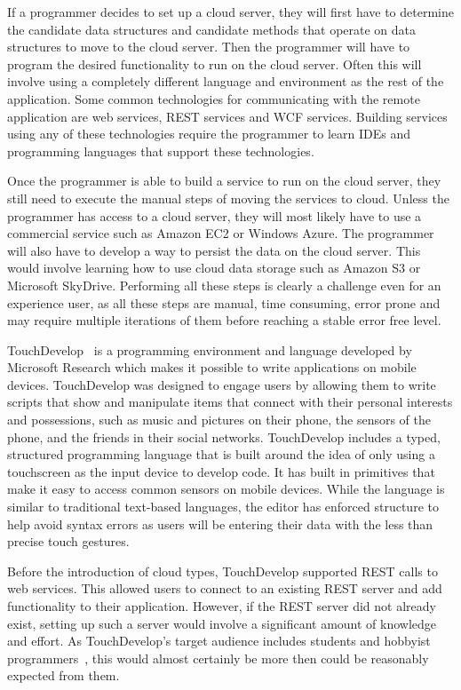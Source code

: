\documentclass{sigplanconf}
\begin{document}
If a programmer decides to set up a cloud server, they will first have to determine the candidate data structures and candidate methods that operate on data structures to move to the cloud server. Then the programmer will have to program the desired functionality to run on the cloud server.  Often this will involve using a completely different language and environment as the rest of the application.  Some common technologies for communicating with the remote application are web services, REST services and WCF services. Building services using any of these technologies require the programmer to learn IDEs and programming languages that support these technologies.

 Once the programmer is able to build a service to run on the cloud server, they still need to execute the manual steps of moving the services to cloud. Unless the programmer has access to a cloud server, they will most likely have to use a commercial service such as Amazon EC2 or Windows Azure. The programmer will also have to develop a way to persist the data on the cloud server.  This would involve learning how to use cloud data storage such as Amazon S3 or Microsoft SkyDrive.  Performing all these steps is clearly a challenge even for an experience user, as all these steps are manual, time consuming, error prone and may require multiple iterations of them before reaching a stable error free level.
  
TouchDevelop~\cite{Tillmann2011TPC20482372048245} is a programming environment and language developed by Microsoft Research which makes it possible to write applications on mobile devices.  TouchDevelop was designed to engage users by allowing them to write scripts that show and manipulate items that connect with their personal interests and possessions, such as music and pictures on their phone, the sensors of the phone, and the friends in their social networks.  TouchDevelop includes a typed, structured programming language that is built around the idea of only using a touchscreen as the input device to develop code.  It has built in primitives that make it easy to access common sensors on mobile devices.  While the language is similar to traditional text-based languages, the editor has enforced structure to help avoid syntax errors as users will be entering their data with the less than precise touch gestures.
  
Before the introduction of cloud types, TouchDevelop supported REST calls to web services.  This allowed users to connect to an existing REST server and add functionality to their application.  However, if the REST server did not already exist, setting up such a server would involve a significant amount of knowledge and effort.  As TouchDevelop's target audience includes students and hobbyist programmers~\cite{Tillmann2011TPC20482372048245}, this would almost certainly be more then could be reasonably expected from them.  
\end{document}
